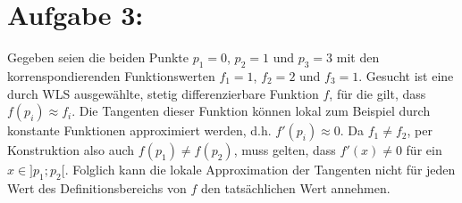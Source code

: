 \section*{Aufgabe 3: }
Gegeben seien die beiden Punkte $p_1 = 0$, $p_2 = 1$ und $p_3 = 3$ mit den korrenspondierenden Funktionswerten $f_1 = 1$, $f_2 = 2$ und $f_3 = 1$. Gesucht ist eine durch WLS ausgewählte, stetig differenzierbare Funktion $f$, für die gilt, dass $f(p_i) \approx f_i$. Die Tangenten dieser Funktion können lokal zum Beispiel durch konstante Funktionen approximiert werden, d.h. $f'(p_i) \approx 0$. Da $f_1 \neq f_2$, per Konstruktion also auch $f(p_1) \neq f(p_2)$, muss gelten, dass $f'(x) \neq 0$ für ein $x \in ]p_1; p_2[$. Folglich kann die lokale Approximation der Tangenten nicht für jeden Wert des Definitionsbereichs von $f$ den tatsächlichen Wert annehmen.\\\\